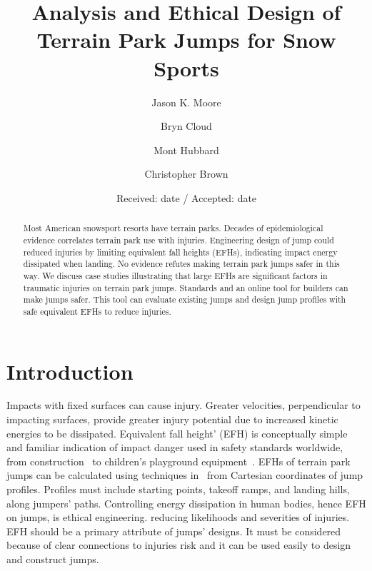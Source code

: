 \documentclass[smallextended]{svjour3}       %
\begin{document}
\title{Analysis and Ethical Design of Terrain Park Jumps for Snow Sports}

\author{Jason K. Moore      \and
        Bryn Cloud          \and
        Mont Hubbard        \and
        Christopher Brown
}



\date{Received: date / Accepted: date}

\maketitle

\begin{abstract}
  Most American snowsport resorts have terrain parks. Decades of epidemiological evidence correlates
  terrain park use with injuries.  Engineering design of jump could reduced injuries by limiting equivalent fall heights (EFHs), indicating impact energy dissipated when landing. No evidence refutes  making terrain park
  jumps safer in this way. We discuss case studies illustrating that large
  EFHs are significant factors in traumatic injuries on
  terrain park jumps. Standards and an online tool for builders can make jumps safer. This tool can evaluate existing jumps and design jump profiles with safe equivalent EFHs to reduce injuries.
\end{abstract}

\section{Introduction}
\label{intro}
%
Impacts with fixed surfaces can  cause injury. Greater
velocities, perpendicular to impacting surfaces, provide greater injury potential due
to  increased kinetic energies to be dissipated. Equivalent fall height' (EFH) is
conceptually simple and familiar indication of impact danger used in safety standards worldwide, from construction~\cite{OSHA2021}
to children's playground equipment~\cite{Chalmers1996}. EFHs of terrain park jumps can be
calculated using techniques in~\cite{McNeil2012} from Cartesian coordinates of jump profiles. Profiles must include starting points, takeoff ramps, and landing hills, along
jumpers' paths. Controlling energy dissipation in human bodies, hence EFH on jumps, is ethical engineering. reducing likelihoods and severities of injuries. EFH should be a primary attribute of jumps' designs. It must be considered because of clear connections to injuries risk and  it can be used easily to design and construct jumps.
\end{document}
